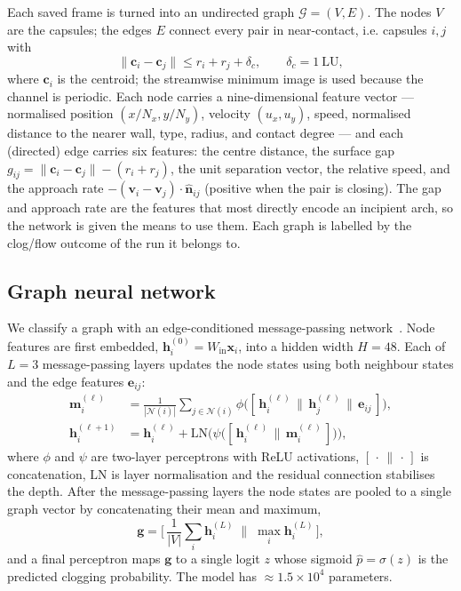 \documentclass[11pt,a4paper]{article}
\begin{document}
Each saved frame is turned into an undirected graph $\mathcal G=(V,E)$.
The nodes $V$ are the capsules; the edges $E$ connect every pair in
near-contact, i.e. capsules $i,j$ with
\begin{equation}
\|\boldsymbol c_i-\boldsymbol c_j\|\le r_i+r_j+\delta_c,
\qquad \delta_c=1~\mathrm{LU},
\label{eq:contact}
\end{equation}
where $\boldsymbol c_i$ is the centroid; the streamwise minimum image is
used because the channel is periodic. Each node carries a
nine-dimensional feature vector --- normalised position $(x/N_x,y/N_y)$,
velocity $(u_x,u_y)$, speed, normalised distance to the nearer wall,
type, radius, and contact degree --- and each (directed) edge carries six
features: the centre distance, the surface gap $g_{ij}=\|\boldsymbol
c_i-\boldsymbol c_j\|-(r_i+r_j)$, the unit separation vector, the
relative speed, and the approach rate $-(\boldsymbol v_i-\boldsymbol
v_j)\!\cdot\!\hat{\boldsymbol n}_{ij}$ (positive when the pair is
closing). The gap and approach rate are the features that most directly
encode an incipient arch, so the network is given the means to use them.
Each graph is labelled by the clog/flow outcome of the run it belongs
to.

\subsection{Graph neural network}
\label{sec:gnn}

We classify a graph with an edge-conditioned message-passing
network~\citep{gilmer2017neural}. Node features are first embedded,
$\boldsymbol h_i^{(0)}=W_{\mathrm{in}}\boldsymbol x_i$, into a hidden
width $H=48$. Each of $L=3$ message-passing layers updates the node
states using both neighbour states and the edge features
$\boldsymbol e_{ij}$:
\begin{align}
\boldsymbol m_i^{(\ell)}&=\frac{1}{|\mathcal N(i)|}\!\!
\sum_{j\in\mathcal N(i)}\!\!
\phi\big([\,\boldsymbol h_i^{(\ell)}\,\|\,\boldsymbol h_j^{(\ell)}\,\|\,
\boldsymbol e_{ij}\,]\big),
\label{eq:message}\\[2pt]
\boldsymbol h_i^{(\ell+1)}&=\boldsymbol h_i^{(\ell)}
+\mathrm{LN}\!\Big(\psi\big([\,\boldsymbol h_i^{(\ell)}\,\|\,
\boldsymbol m_i^{(\ell)}\,]\big)\Big),
\label{eq:update}
\end{align}
where $\phi$ and $\psi$ are two-layer perceptrons with ReLU
activations, $[\,\cdot\,\|\,\cdot\,]$ is concatenation, $\mathrm{LN}$ is
layer normalisation and the residual connection stabilises the depth.
After the message-passing layers the node states are pooled to a single
graph vector by concatenating their mean and maximum,
\begin{equation}
\boldsymbol g=\big[\,\textstyle\frac{1}{|V|}\sum_i\boldsymbol h_i^{(L)}
\;\big\|\;\max_i\boldsymbol h_i^{(L)}\,\big],
\label{eq:pool}
\end{equation}
and a final perceptron maps $\boldsymbol g$ to a single logit
$z$ whose sigmoid $\hat p=\sigma(z)$ is the predicted clogging
probability. The model has $\approx 1.5\times10^4$ parameters.
\end{document}
